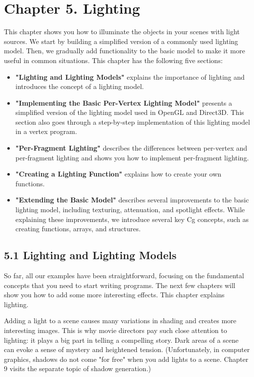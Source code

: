 \documentclass[../main.tex]{subfiles}
\begin{document}
\chapter{Chapter 5. Lighting}

This chapter shows you how to illuminate the objects in your scenes with light sources. We start by building a simplified version of a commonly used lighting model. Then, we gradually add functionality to the basic model to make it more useful in common situations. This chapter has the following five sections:

\begin{itemize}
\item \textbf{"Lighting and Lighting Models"} explains the importance of lighting and introduces the concept of a lighting model.
\item \textbf{"Implementing the Basic Per-Vertex Lighting Model"} presents a simplified version of the lighting model used in OpenGL and Direct3D. This section also goes through a step-by-step implementation of this lighting model in a vertex program.
\item \textbf{"Per-Fragment Lighting"} describes the differences between per-vertex and per-fragment lighting and shows you how to implement per-fragment lighting.
\item \textbf{"Creating a Lighting Function"} explains how to create your own functions.
\item \textbf{"Extending the Basic Model"} describes several improvements to the basic lighting model, including texturing, attenuation, and spotlight effects. While explaining these improvements, we introduce several key Cg concepts, such as creating functions, arrays, and structures.
\end{itemize}

\section{5.1 Lighting and Lighting Models}

So far, all our examples have been straightforward, focusing on the fundamental concepts that you need to start writing programs. The next few chapters will show you how to add some more interesting effects. This chapter explains lighting.

Adding a light to a scene causes many variations in shading and creates more interesting images. This is why movie directors pay such close attention to lighting: it plays a big part in telling a compelling story. Dark areas of a scene can evoke a sense of mystery and heightened tension. (Unfortunately, in computer graphics, shadows do not come "for free" when you add lights to a scene. Chapter 9 visits the separate topic of shadow generation.)
\end{document}
